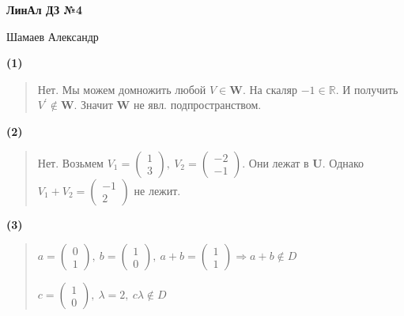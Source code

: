 \documentclass{article}
\begin{document}
\setlength{\parindent}{0pt}
\begin{Large}
    \textsf{\textbf{ЛинАл ДЗ №4}}
    
    Шамаев Александр    
\end{Large}
\vspace{1cm}

\textsf{\textbf{(1)}}

\begin{quote}
Нет. Мы можем домножить любой $V \in \textbf{W}$. На скаляр $-1 \in \mathbb{R}$. 
И получить $V^{'} \not \in \textbf{W}$. Значит $\textbf{W}$ не явл. подпространством.
\end{quote}

\textsf{\textbf{(2)}}

\begin{quote}
Нет. Возьмем $V_1 = \begin{pmatrix} 1 \\ 3 \end{pmatrix}, \ V_2 = \begin{pmatrix} -2 \\ -1 \end{pmatrix}$. Они лежат в \textbf{U}. Однако $V_1 + V_2 = \begin{pmatrix} -1 \\ 2\end{pmatrix}$ не лежит.
\end{quote}



\textsf{\textbf{(3)}}

\begin{quote}
$a = \begin{pmatrix} 0 \\ 1 \end{pmatrix}  , \ b = \begin{pmatrix}
    1 \\ 0
\end{pmatrix}, \ a + b = \begin{pmatrix}
   1 \\ 1 
\end{pmatrix} \Rightarrow
a + b \not \in D$

$c = \begin{pmatrix}
    1 \\ 0
\end{pmatrix}, \ \lambda = 2, \ c \lambda \not \in D$
\end{quote}
\end{document}
